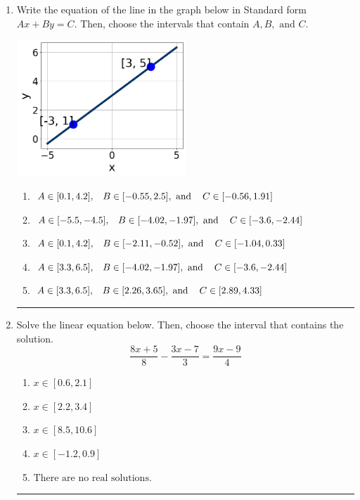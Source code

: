 \documentclass[14pt]{extbook}
\newcommand{\litem}[1]{\item#1\hspace*{-1cm}\rule{\textwidth}{0.4pt}}
\begin{document}
\begin{enumerate}
{\begin{enumerate}[label=\Alph*.]
\end{enumerate} }
\litem{
Write the equation of the line in the graph below in Standard form $Ax+By=C$. Then, choose the intervals that contain $A, B, \text{ and } C$.
\begin{center}
    \includegraphics[width=0.5\textwidth]{../Figures/linearGraphToStandardA.png}
\end{center}
\begin{enumerate}[label=\Alph*.]
\item \( A \in [0.1, 4.2], \hspace{3mm} B \in [-0.55, 2.5], \text{ and } \hspace{3mm} C \in [-0.56, 1.91] \)
\item \( A \in [-5.5, -4.5], \hspace{3mm} B \in [-4.02, -1.97], \text{ and } \hspace{3mm} C \in [-3.6, -2.44] \)
\item \( A \in [0.1, 4.2], \hspace{3mm} B \in [-2.11, -0.52], \text{ and } \hspace{3mm} C \in [-1.04, 0.33] \)
\item \( A \in [3.3, 6.5], \hspace{3mm} B \in [-4.02, -1.97], \text{ and } \hspace{3mm} C \in [-3.6, -2.44] \)
\item \( A \in [3.3, 6.5], \hspace{3mm} B \in [2.26, 3.65], \text{ and } \hspace{3mm} C \in [2.89, 4.33] \)

\end{enumerate} }
\litem{
Solve the linear equation below. Then, choose the interval that contains the solution.\[ \frac{8x + 5}{8} - \frac{3x -7}{3} = \frac{9x -9}{4} \]\begin{enumerate}[label=\Alph*.]
\item \( x \in [0.6, 2.1] \)
\item \( x \in [2.2, 3.4] \)
\item \( x \in [8.5, 10.6] \)
\item \( x \in [-1.2, 0.9] \)
\item \( \text{There are no real solutions.} \)


\end{enumerate}}
\end{enumerate}
\end{document}
